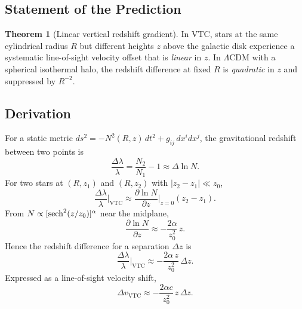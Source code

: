 \documentclass[11pt,a4paper]{article}
\theoremstyle{definition}
\newtheorem{theorem}{Theorem}[section]
\newcommand{\VTC}{\mathrm{VTC}}
\begin{document}
\subsection{Statement of the Prediction}

\begin{theorem}[Linear vertical redshift gradient]
In VTC, stars at the same cylindrical radius $R$ but different heights $z$ above the galactic disk experience a systematic line-of-sight velocity offset that is \emph{linear} in $z$. In $\Lambda$CDM with a spherical isothermal halo, the redshift difference at fixed $R$ is \emph{quadratic} in $z$ and suppressed by $R^{-2}$.
\end{theorem}

\subsection{Derivation}

For a static metric $ds^2=-N^2(R,z)\,dt^2+g_{ij}\,dx^i dx^j$, the gravitational redshift between two points is
\begin{equation}
    \frac{\Delta\lambda}{\lambda} = \frac{N_2}{N_1}-1 \approx \Delta\ln N.
\end{equation}
For two stars at $(R,z_1)$ and $(R,z_2)$ with $|z_2-z_1|\ll z_0$,
\begin{equation}
    \frac{\Delta\lambda}{\lambda}\bigg|_{\VTC} \approx \frac{\partial\ln N}{\partial z}\bigg|_{z=0}\!(z_2-z_1).
\end{equation}
From $N\propto [\sech^2(z/z_0)]^\alpha$ near the midplane,
\begin{equation}
    \frac{\partial\ln N}{\partial z} \approx -\frac{2\alpha}{z_0^2}\,z.
\end{equation}
Hence the redshift difference for a separation $\Delta z$ is
\begin{equation}
    \frac{\Delta\lambda}{\lambda}\bigg|_{\VTC} \approx -\frac{2\alpha\,z}{z_0^2}\,\Delta z.
\end{equation}
Expressed as a line-of-sight velocity shift,
\begin{equation}
    \boxed{\Delta v_{\VTC} \approx -\frac{2\alpha c}{z_0^2}\,z\,\Delta z.}
\end{equation}
\end{document}

